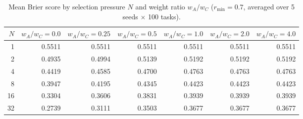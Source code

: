 \begin{table}[htbp]
\centering
\caption{Mean Brier score by selection pressure $N$ and weight ratio $w_A/w_C$ ($r_{\min} = 0.7$, averaged over 5 seeds $\times$ 100 tasks).}
\label{tab:brier_summary}
\small
\begin{tabular}{@{}rrrrrrr@{}}
\toprule
  $N$ & $w_A/w_C = 0.0$ & $w_A/w_C = 0.25$ & $w_A/w_C = 0.5$ & $w_A/w_C = 1.0$ & $w_A/w_C = 2.0$ & $w_A/w_C = 4.0$ \\
\midrule
  1 & 0.5511 & 0.5511 & 0.5511 & 0.5511 & 0.5511 & 0.5511 \\
  2 & 0.4935 & 0.4994 & 0.5139 & 0.5192 & 0.5192 & 0.5192 \\
  4 & 0.4419 & 0.4585 & 0.4700 & 0.4763 & 0.4763 & 0.4763 \\
  8 & 0.3947 & 0.4195 & 0.4345 & 0.4423 & 0.4423 & 0.4423 \\
  16 & 0.3304 & 0.3606 & 0.3831 & 0.3939 & 0.3939 & 0.3939 \\
  32 & 0.2739 & 0.3111 & 0.3503 & 0.3677 & 0.3677 & 0.3677 \\
\bottomrule
\end{tabular}
\end{table}
